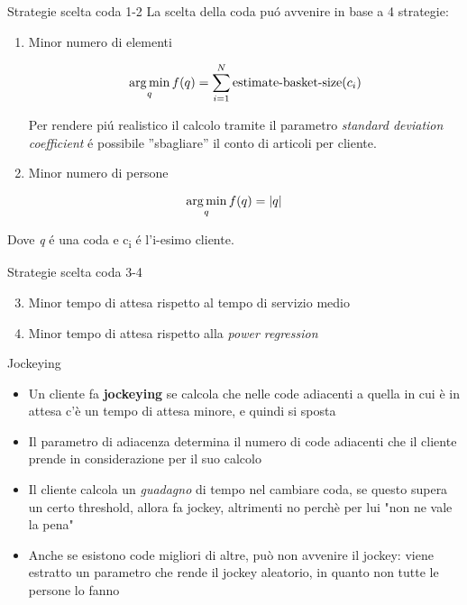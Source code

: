 \begin{frame}{Strategie scelta coda 1-2}
  La scelta della coda puó avvenire in base a 4 strategie:
  \begin{enumerate}
  \item Minor numero di elementi

    \begin{equation}
      \operatorname*{arg\,min}_q f(q) = \sum\limits_{i=1}^N \text{estimate-basket-size}(c_i) 
    \end{equation}

    Per rendere piú realistico il calcolo tramite il parametro
    \textit{standard deviation coefficient} é possibile ''sbagliare''
    il conto di articoli per cliente.
    
  \item Minor numero di persone
   \end{enumerate}
   
   \begin{equation}
     \operatorname*{arg\,min}_q f(q) = |q|
   \end{equation}

   Dove \textit{q} é una coda e c\textsubscript{i} é l'i-esimo
   cliente.   
 \end{frame}



\begin{frame}{Strategie scelta coda 3-4}
  \begin{enumerate}
    \setcounter{enumi}{2}
  \item Minor tempo di attesa rispetto al tempo di servizio medio
  \item Minor tempo di attesa rispetto alla \textit{power regression}
  \end{enumerate}
\end{frame}




\begin{frame}{Jockeying}
	\begin{itemize}
		\item Un cliente fa \textbf{jockeying} se calcola che nelle code adiacenti a quella in cui è in attesa c'è un tempo di attesa minore, e quindi si sposta
		\item Il parametro di adiacenza determina il numero di code adiacenti che il cliente prende in considerazione per il suo calcolo
		\item Il cliente calcola un \textit{guadagno} di tempo nel cambiare coda, se questo supera un certo threshold, allora fa jockey, altrimenti no perchè per lui "non ne vale la pena"
		\item Anche se esistono code migliori di altre, può non avvenire il jockey: viene estratto un parametro che rende il jockey aleatorio, in quanto non tutte le persone lo fanno
	\end{itemize}
\end{frame}

